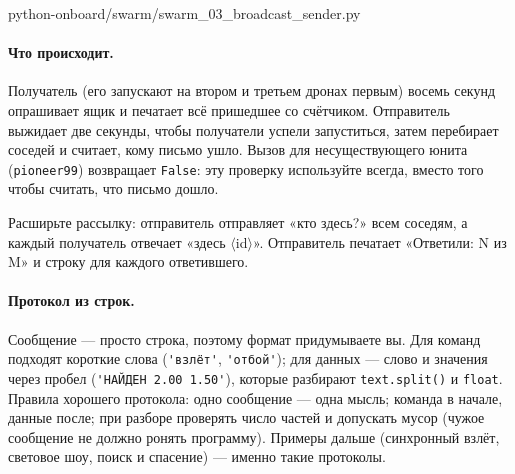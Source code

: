 \begin{codefile}[python]{python-onboard/swarm/swarm_03_broadcast_sender.py}
\end{codefile}

\paragraph{Что происходит.} Получатель (его запускают на втором и третьем дронах первым) восемь секунд опрашивает ящик и печатает всё пришедшее со счётчиком. Отправитель выжидает две секунды, чтобы получатели успели запуститься, затем перебирает соседей и считает, кому письмо ушло. Вызов для несуществующего юнита (\texttt{pioneer99}) возвращает \verb|False|: эту проверку используйте всегда, вместо того чтобы считать, что письмо дошло.

\begin{taskbox}
Расширьте рассылку: отправитель отправляет «кто здесь?» всем соседям, а каждый получатель отвечает «здесь $\langle$id$\rangle$». Отправитель печатает «Ответили: N из M» и строку для каждого ответившего.
\end{taskbox}

\paragraph{Протокол из строк.} Сообщение --- просто строка, поэтому формат придумываете вы. Для команд подходят короткие слова (\verb|'взлёт'|, \verb|'отбой'|); для данных --- слово и значения через пробел (\verb|'НАЙДЕН 2.00 1.50'|), которые разбирают \verb|text.split()| и \verb|float|. Правила хорошего протокола: одно сообщение --- одна мысль; команда в начале, данные после; при разборе проверять число частей и допускать мусор (чужое сообщение не должно ронять программу). Примеры дальше (синхронный взлёт, световое шоу, поиск и спасение) --- именно такие протоколы.
